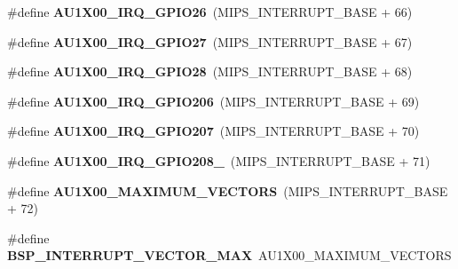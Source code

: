 \begin{DoxyCompactItemize}
\#define {\bfseries A\+U1\+X00\+\_\+\+I\+R\+Q\+\_\+\+G\+P\+I\+O26}~(M\+I\+P\+S\+\_\+\+I\+N\+T\+E\+R\+R\+U\+P\+T\+\_\+\+B\+A\+SE + 66)
\item 
\mbox{\label{group__bsp__interrupt_ga81fc7fe963720c2f7868d4659653374a}} 
\#define {\bfseries A\+U1\+X00\+\_\+\+I\+R\+Q\+\_\+\+G\+P\+I\+O27}~(M\+I\+P\+S\+\_\+\+I\+N\+T\+E\+R\+R\+U\+P\+T\+\_\+\+B\+A\+SE + 67)
\item 
\mbox{\label{group__bsp__interrupt_gae2f3acf6eb8ff88725fe19546f2739a3}} 
\#define {\bfseries A\+U1\+X00\+\_\+\+I\+R\+Q\+\_\+\+G\+P\+I\+O28}~(M\+I\+P\+S\+\_\+\+I\+N\+T\+E\+R\+R\+U\+P\+T\+\_\+\+B\+A\+SE + 68)
\item 
\mbox{\label{group__bsp__interrupt_ga269d37c3ec92a4c2cb41242602335aab}} 
\#define {\bfseries A\+U1\+X00\+\_\+\+I\+R\+Q\+\_\+\+G\+P\+I\+O206}~(M\+I\+P\+S\+\_\+\+I\+N\+T\+E\+R\+R\+U\+P\+T\+\_\+\+B\+A\+SE + 69)
\item 
\mbox{\label{group__bsp__interrupt_ga76b78daabde0f694ff559a762a43e7da}} 
\#define {\bfseries A\+U1\+X00\+\_\+\+I\+R\+Q\+\_\+\+G\+P\+I\+O207}~(M\+I\+P\+S\+\_\+\+I\+N\+T\+E\+R\+R\+U\+P\+T\+\_\+\+B\+A\+SE + 70)
\item 
\mbox{\label{group__bsp__interrupt_ga4669a811ada5f0507a82bbf7ee08d571}} 
\#define {\bfseries A\+U1\+X00\+\_\+\+I\+R\+Q\+\_\+\+G\+P\+I\+O208\+\_}~(M\+I\+P\+S\+\_\+\+I\+N\+T\+E\+R\+R\+U\+P\+T\+\_\+\+B\+A\+SE + 71)
\item 
\mbox{\label{group__bsp__interrupt_ga93cc4cec956f05b87802918139a72a42}} 
\#define {\bfseries A\+U1\+X00\+\_\+\+M\+A\+X\+I\+M\+U\+M\+\_\+\+V\+E\+C\+T\+O\+RS}~(M\+I\+P\+S\+\_\+\+I\+N\+T\+E\+R\+R\+U\+P\+T\+\_\+\+B\+A\+SE + 72)
\item 
\mbox{\label{group__bsp__interrupt_gae4a2cdda5816a4c83c2fac0a49880c6e}} 
\#define {\bfseries B\+S\+P\+\_\+\+I\+N\+T\+E\+R\+R\+U\+P\+T\+\_\+\+V\+E\+C\+T\+O\+R\+\_\+\+M\+AX}~A\+U1\+X00\+\_\+\+M\+A\+X\+I\+M\+U\+M\+\_\+\+V\+E\+C\+T\+O\+RS
\item 
\mbox{\label{group__bsp__interrupt_ga64cbb02dfea4d6923abccaa0087d2a0d}} 

\end{DoxyCompactItemize}
